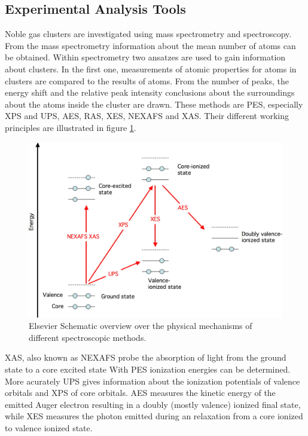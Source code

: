 \subsection{Experimental Analysis Tools}
Noble gas clusters are investigated using mass spectrometry and spectroscopy.
From the mass spectrometry information about the mean number of atoms
can be obtained. Within spectrometry two ansatzes are used
to gain information about clusters. In the first one, measurements of
atomic properties for atoms in clusters are compared to the results of
atoms. From the number of peaks, the energy shift and the relative peak
intensity conclusions about the surroundings about the atoms inside
the cluster are drawn. These methods are \ac{PES}, especially \ac{XPS}
and \ac{UPS}, \ac{AES}, \ac{RAS}, \ac{XES}, \ac{NEXAFS} and \ac{XAS}.
Their different working principles are illustrated in figure
\ref{figure:overview_spectroscopies}.

\begin{figure}[h]
  \centering
  \includegraphics[scale=1.0]{pics/overview_spectroscopies.jpeg}
  \caption{Elsevier Schematic overview over the physical mechanisms of different
           spectroscopic methods.}
  \label{figure:overview_spectroscopies}
\end{figure}

\ac{XAS}, also known as \ac{NEXAFS} probe the absorption of light
from the ground state to a core excited state With \ac{PES} ionization
energies can be determined. More acurately \ac{UPS} gives information
about the ionization potentials of valence orbitals and \ac{XPS}
of core orbitals.
\ac{AES} measures the kinetic energy of the emitted Auger electron
resulting in a doubly (mostly valence) ionized final state, while
\ac{XES} measures the photon emitted during an relaxation from
a core ionized to valence ionized state.

